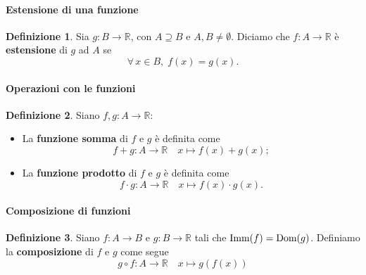 \documentclass{article}
\theoremstyle{plain}
\theoremstyle{definition}
\newtheorem{defn}{Definizione}[section]
\theoremstyle{remark}
\begin{document}
\vspace{10pt}

\paragraph{Estensione di una funzione}
\begin{bxthm}
\begin{defn}
    Sia $g:B\to\mathbb{R}$, con $A\supseteq B$ e $A,B\neq\emptyset$.
    Diciamo che $f:A\to\mathbb{R}$ è \textbf{estensione} di $g$ ad $A$ se 
    \[\forall\, x\in B,\; f(x)=g(x).\]
\end{defn}
\end{bxthm}

\vspace{10pt}

\paragraph{Operazioni con le funzioni}
\begin{bxthm}
\begin{defn}
    Siano $f,g:A\to\mathbb{R}$:
    \begin{itemize}
        \item La \textbf{funzione somma} di $f$ e $g$ è definita come 
        \[f+g:A\to\mathbb{R}\quad x\mapsto f(x)+g(x);\]
        \item La \textbf{funzione prodotto} di $f$ e $g$ è definita come 
        \[f\cdot g:A\to\mathbb{R}\quad x\mapsto f(x)\cdot g(x).\]
    \end{itemize}
\end{defn}
\end{bxthm}

\vspace{10pt}

\paragraph{Composizione di funzioni}
\begin{bxthm}
\begin{defn}
    Siano $f:A\to B$ e $g:B\to\mathbb{R}$ tali che $\textup{Imm}(f)=\textup{Dom}(g)$. Definiamo la \textbf{composizione} di $f$ e $g$ come segue
    \[g\circ f:A\to\mathbb{R}\quad x\mapsto g(f(x))\]
\end{defn}
\end{bxthm}

\vspace{10pt}
\end{document}
